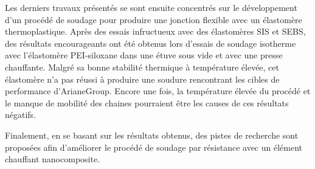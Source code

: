 Les derniers travaux présentés se sont ensuite concentrés sur le développement d'un procédé de soudage pour produire une jonction flexible avec un élastomère thermoplastique. 
Après des essais infructueux avec des élastomères SIS et SEBS, des résultats encourageants ont été obtenus lors d'essais de soudage isotherme avec l'élastomère PEI-siloxane dans une étuve sous vide et avec une presse chauffante. 
Malgré sa bonne stabilité thermique à température élevée, cet élastomère n'a pas réussi à produire une soudure rencontrant les cibles de performance d'ArianeGroup. 
Encore une fois, la température élevée du procédé et le manque de mobilité des chaines pourraient être les causes de ces résultats négatifs. 

Finalement, en se basant sur les résultats obtenus, des pistes de recherche sont proposées afin d'améliorer le procédé de soudage par résistance avec un élément chauffant nanocomposite. 





%

